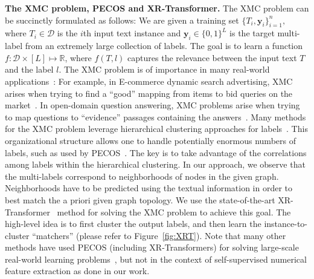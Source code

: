 \documentclass{article} \usepackage{iclr2022_conference,times}
\begin{document}
\textbf{The XMC problem, PECOS and XR-Transformer.} 
The XMC problem can be succinctly formulated as follows: We are given a training set $\{T_i,\mathbf{y}_i\}_{i=1}^n,$ where $T_i\in \mathcal{D}$ is the $i$th input text instance and $\mathbf{y}_i \in \{0,1\}^L$ is the target multi-label from an extremely large collection of labels. The goal is to learn a function $f: \mathcal{D}\times [L] \mapsto \mathbb{R}$, where $f(T,l)$ captures the relevance between the input text $T$ and the label $l$. The XMC problem is of importance in many real-world applications~\citep{jiang2021lightxml,ye2020pretrained}: For example, in E-commerce dynamic search advertising, XMC arises when trying to find a ``good'' mapping from items to bid queries on the market~\citep{prabhu2018parabel,prabhu2014fastxml}. In open-domain question answering, XMC problems arise when trying to map questions to ``evidence'' passages containing the answers~\citep{chang2020pretraining,lee2019latent}. Many methods for the XMC problem leverage hierarchical clustering approaches for labels~\citep{prabhu2018parabel,you2019attentionxml}. This organizational structure allows one to handle potentially enormous numbers of labels, such as used by PECOS~\citep{yu2020pecos}. The key is to take advantage of the correlations among labels within the hierarchical clustering. 
In our approach, we observe that the multi-labels correspond to neighborhoods of nodes in the given graph. Neighborhoods have to be predicted using the textual information in order to best match the a priori given graph topology. We use the state-of-the-art XR-Transformer~\citep{jiong2021fast} method for solving the XMC problem to achieve this goal. The high-level idea is to first cluster the output labels, and then learn the instance-to-cluster ``matchers'' (please refer to Figure~\ref{fig:XRT}). Note that many other methods have used PECOS (including XR-Transformers) for solving large-scale real-world learning problems~\citep{etter2021accelerating,liu2021label,chang2020taming,baharav2021enabling,chang2021extreme,yadav2021session,sen2021top}, but not in the context of self-supervised numerical feature extraction as done in our work. 
\end{document}
